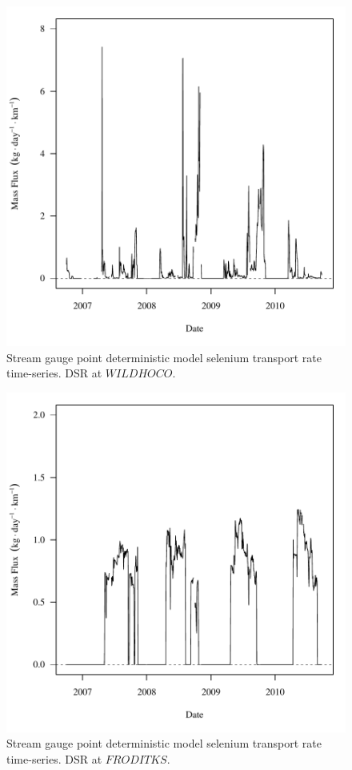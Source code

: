 \begin{figure}[htbp]
	\begin{center}
	\includegraphics[width=6in]{"Figures/Results_DDSR/f WIL"}
	\caption{Stream gauge point deterministic model selenium transport rate time-series.  DSR at $WILDHOCO$.}
	\end{center}
\end{figure}
\newpage

\begin{figure}[htbp]
	\begin{center}
	\includegraphics[width=6in]{"Figures/Results_DDSR/f FRO"}
	\caption{Stream gauge point deterministic model selenium transport rate time-series.  DSR at $FRODITKS$.}
	\end{center}
\end{figure}
\newpage


